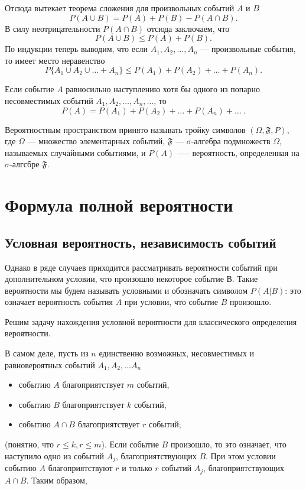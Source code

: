 Отсюда вытекает теорема сложения для произвольных событий $A$ и $B$
$$
P(A \cup B) = P(A) + P(B) - P(A\cap B).
$$
В силу неотрицательности $P(A\cap B)$ отсюда заключаем, что
$$
P(A \cup B) \le P(A) + P(B).
$$
По индукции теперь выводим, что если $A_1,A_2, \ldots,A_n$ --- произвольные события, то имеет место неравенство
$$
P\{ A_1 \cup A_2 \cup \ldots + A_n \} \le P(A_1) + P(A_2) + \ldots + P(A_n).
$$
\begin{axiome}
 Если событие $A$ равносильно наступлению хотя бы одного из попарно несовместимых событий $A_1,A_2,\ldots,A_n,\ldots$, то
$$
P(A) = P(A_1) + P(A_2) + \ldots + P(A_n) + \ldots \: .
$$
\end{axiome}
Вероятностным пространством принято называть тройку символов $(\Omega, \mathfrak{F}, P)$, где $\Omega$ --- множество элементарных событий, $\mathfrak{F}$ — $\sigma$-алгебра подмножеств $\Omega$, называемых случайными событиями, и $P(A)$ --— вероятность, определенная на $\sigma$-алгсбре $\mathfrak{F}$.

\section{Формула полной вероятности}
\subsection{Условная вероятность, независимость событий}

Однако в ряде случаев приходится рассматривать вероятности событий при дополнительном условии, что произошло некоторое событие В. Такие вероятности мы будем называть условными и обозначать символом $P(A|B)$: это означает вероятность события $A$ при условии, что событие $B$ произошло.
 
Решим задачу нахождения условной вероятности для классического определения вероятности.

В самом деле, пусть из $n$ единственно возможных, несовместимых и равновероятных событий $A_1,A_2,\dots A_n$
\begin{itemize}
\item событию $A$ благоприятствует $m$ событий, 
\item событию $B$ благоприятствует $k$ событий,
\item событию $A\cap B$ благоприятствует $r$ событий;
\end{itemize}

(понятно, что $r \le k, r \le m$). Если событие $B$ произошло, то это означает, что наступило одно из событий $A_j$, благоприятствующих $B$. При этом условии событию $A$ благоприятствуют $r$ и только $r$ событий $A_j$, благоприятствующих $A\cap B$. Таким образом,

